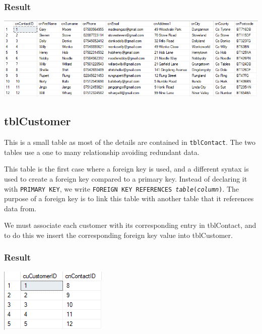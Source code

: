 \documentclass[11pt,a4paper]{scrartcl}
\begin{document}
	\subsubsection*{Result}
	
	\begin{center}
		\includegraphics[width=0.95\linewidth]{images/Contact}
	\end{center}
	
	\subsection{tblCustomer}\label{tblcustomer}
	
	This is a small table as most of the details are contained in \texttt{tblContact}. The two tables use a one to many relationship avoiding redundant data.
	
	
	
	This table is the first case where a foreign key is used, and a different syntax is used to create a foreign key compared to a primary key. Instead of declaring it with \texttt{PRIMARY KEY}, we write \texttt{FOREIGN KEY REFERENCES \textit{table}(\textit{column})}. The purpose of a foreign key is to link this table with another table that it references data from.
	
	We must associate each customer with its corresponding entry in tblContact, and to do this we insert the corresponding foreign key value into tblCustomer.
	
	\subsubsection*{Result}
	
	\begin{center}
		\includegraphics[width=0.3\linewidth]{images/Customer}
	\end{center}
	
\end{document}
